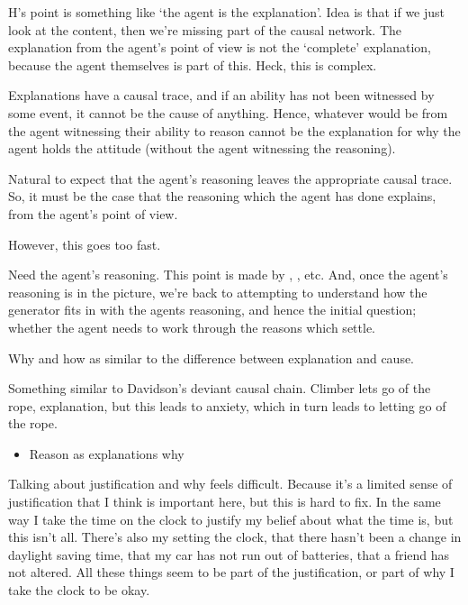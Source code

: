 \documentclass[10pt]{article}
\begin{document}
\begin{note}
  H's point is something like `the agent is the explanation'.
  {
    \color{red}
    Idea is that if we just look at the content, then we're missing part of the causal network.
    The explanation from the agent's point of view is not the `complete' explanation, because the agent themselves is part of this.
    Heck, this is complex.
  }

  Explanations have a causal trace, and if an ability has not been witnessed by some event, it cannot be the cause of anything.
  Hence, whatever would be from the agent witnessing their ability to reason cannot be the explanation for why the agent holds the attitude (without the agent witnessing the reasoning).

  Natural to expect that the agent's reasoning leaves the appropriate causal trace.
  So, it must be the case that the reasoning which the agent has done explains, from the agent's point of view.

  However, this goes too fast.

  Need the agent's reasoning.
  This point is made by \citeauthor[233]{Davidson:2001aa}, \citeauthor{Hieronymi:2018aa}, etc.
  And, once the agent's reasoning is in the picture, we're back to attempting to understand how the generator fits in with the agents reasoning, and hence the initial question; whether the agent needs to work through the reasons which settle.
\end{note}

\begin{note}
  Why and how as similar to the difference between explanation and cause.

  Something similar to Davidson's deviant causal chain.
  Climber lets go of the rope, explanation, but this leads to anxiety, which in turn leads to letting go of the rope.
\end{note}

\begin{itemize}
\item Reason as explanations why
\end{itemize}

\begin{note}
  Talking about justification and why feels difficult.
  Because it's a limited sense of justification that I think is important here, but this is hard to fix.
  In the same way I take the time on the clock to justify my belief about what the time is, but this isn't all.
  There's also my setting the clock, that there hasn't been a change in daylight saving time, that my car has not run out of batteries, that a friend has not altered.
  All these things seem to be part of the justification, or part of why I take the clock to be okay.
  
\end{note}
\end{document}
